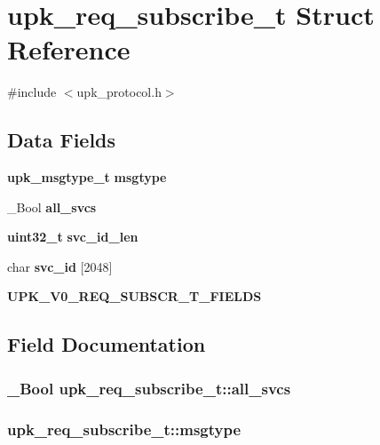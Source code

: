 \section{upk\_\-req\_\-subscribe\_\-t Struct Reference}
\label{structupk__req__subscribe__t}


{\ttfamily \#include $<$upk\_\-protocol.h$>$}

\subsection*{Data Fields}
\begin{DoxyCompactItemize}
\item 
{\bf upk\_\-msgtype\_\-t} {\bf msgtype}
\item 
\_\-Bool {\bf all\_\-svcs}
\item 
{\bf uint32\_\-t} {\bf svc\_\-id\_\-len}
\item 
char {\bf svc\_\-id} [2048]
\item 
{\bf UPK\_\-V0\_\-REQ\_\-SUBSCR\_\-T\_\-FIELDS}
\end{DoxyCompactItemize}


\subsection{Field Documentation}
\subsubsection[{all\_\-svcs}]{\setlength{\rightskip}{0pt plus 5cm}\_\-Bool {\bf upk\_\-req\_\-subscribe\_\-t::all\_\-svcs}}\label{structupk__req__subscribe__t_a96c14545a9a8abafdbfea9820799c4f5}
\subsubsection[{msgtype}]{ {\bf upk\_\-req\_\-subscribe\_\-t::msgtype}}\label{structupk__req__subscribe__t_a434f2620375f755bd5421102d1c39910}
